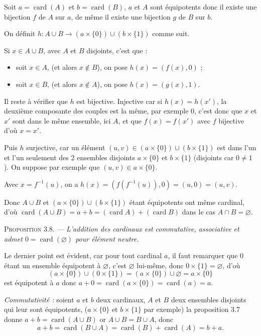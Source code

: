 Soit $a=\operatorname{card}(A)$ et $b=\operatorname{card}(B)$, $a$ et $A$ sont équipotents donc il existe une bijection $f$ de $A$ sur $a$, de même il existe une bijection $g$ de $B$ sur $b$.

On définit $h:A\cup B\longrightarrow(a\times\{0\})\cup(b\times\{1\})$ comme suit.

Si $x\in A\cup B$, avec $A$ et $B$ disjoints, c'est que :
\begin{itemize}[leftmargin=2em]
\item soit $x\in A$, (et alors $x\notin B$), on pose $h(x)=(f(x),0)$ ;
\item soit $x\in B$, (et alors $x\notin A$), on pose $h(x)=(g(x),1)$.
\end{itemize}
Il reste à vérifier que $h$ est bijective. Injective car si $h(x)=h(x')$, la deuxième composante des couples est la même, par exemple $0$, c'est donc que $x$ et $x'$ sont dans le même ensemble, ici $A$, et que $f(x)=f(x')$ avec $f$ bijective d'où $x=x'$.

Puis $h$ surjective, car un élément $(u,v)\in(a\times\{0\})\cup(b\times\{1\})$ est dans l'un et l'un seulement des 2 ensembles disjoints $a\times\{0\}$ et $b\times\{1\}$ (disjoints car $0\ne1$). On suppose par exemple que $(u,v)\in a\times\{0\}$.

Avec $x=f^{-1}(u)$, on a $h(x)=(f(f^{-1}(u)),0)=(u,0)=(u,v)$.

Donc $A\cup B$ et $(a\times\{0\})\cup(b\times\{1\})$ étant équipotents ont même cardinal, d'où $\operatorname{card}(A\cup B)=a+b=(\operatorname{card}A)+(\operatorname{card}B)$ dans le cas $A\cap B=\varnothing$. \bookend

\medskip\noindent\textsc{Proposition 3.8.} --- \emph{L'addition des cardinaux est commutative, associative et admet $0=\operatorname{card}(\varnothing)$ pour élément neutre.}

Le dernier point est évident, car pour tout cardinal $a$, il faut remarquer que $0$ étant un ensemble équipotent à $\varnothing$, c'est $\varnothing$ lui-même, donc $0\times\{1\}=\varnothing$, d'où
\[
(a\times\{0\})\cup(0\times\{1\})=(a\times\{0\})\cup\varnothing=a\times\{0\}
\]
est équipotent à $a$ donc $a+0=\operatorname{card}(a\times\{0\})=\operatorname{card}(a)=a$.

\emph{Commutativité :} soient $a$ et $b$ deux cardinaux, $A$ et $B$ deux ensembles disjoints qui leur sont équipotents, ($a\times\{0\}$ et $b\times\{1\}$ par exemple) la proposition 3.7 donne $a+b=\operatorname{card}(A\cup B)$ or $A\cup B=B\cup A$, donc
\[
a+b=\operatorname{card}(B\cup A)=\operatorname{card}(B)+\operatorname{card}(A)=b+a.
\]

